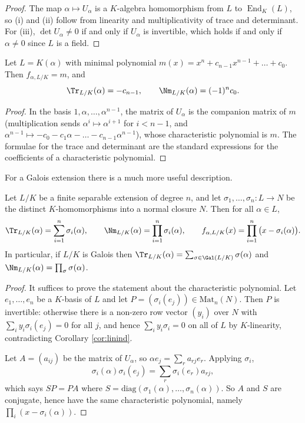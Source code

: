 \begin{proof}
	The map $\alpha \mapsto U_\alpha$ is a $K$-algebra homomorphism from $L$ to $\operatorname{End}_K(L)$, so (i) and (ii) follow from linearity and multiplicativity of trace and determinant. For (iii), $\det U_\alpha \neq 0$ if and only if $U_\alpha$ is invertible, which holds if and only if $\alpha \neq 0$ since $L$ is a field.
\end{proof}

\begin{proposition}\label{prop:charpolymin}
	Let $L = K(\alpha)$ with minimal polynomial $m(x) = x^n + c_{n-1}x^{n-1}+\dots+c_0$. Then $f_{\alpha,L/K} = m$, and
	$$\Tr_{L/K}(\alpha) = -c_{n-1}, \qquad \Nm_{L/K}(\alpha) = (-1)^nc_0.$$
\end{proposition}

\begin{proof}
	In the basis $1,\alpha,\dots,\alpha^{n-1}$, the matrix of $U_\alpha$ is the companion matrix of $m$ (multiplication sends $\alpha^i\mapsto\alpha^{i+1}$ for $i<n-1$, and $\alpha^{n-1}\mapsto -c_0-c_1\alpha-\dots-c_{n-1}\alpha^{n-1}$), whose characteristic polynomial is $m$. The formulae for the trace and determinant are the standard expressions for the coefficients of a characteristic polynomial.
\end{proof}

For a Galois extension there is a much more useful description.

\begin{proposition}\label{prop:tracegalois}
	Let $L/K$ be a finite separable extension of degree $n$, and let $\sigma_1,\dots,\sigma_n : L \to N$ be the distinct $K$-homomorphisms into a normal closure $N$. Then for all $\alpha \in L$,
	$$\Tr_{L/K}(\alpha) = \sum_{i=1}^n\sigma_i(\alpha), \qquad \Nm_{L/K}(\alpha) = \prod_{i=1}^n\sigma_i(\alpha), \qquad f_{\alpha,L/K}(x) = \prod_{i=1}^n\big(x - \sigma_i(\alpha)\big).$$
	In particular, if $L/K$ is Galois then $\Tr_{L/K}(\alpha) = \sum_{\sigma\in\Gal(L/K)}\sigma(\alpha)$ and $\Nm_{L/K}(\alpha)=\prod_{\sigma}\sigma(\alpha)$.
\end{proposition}

\begin{proof}
	It suffices to prove the statement about the characteristic polynomial. Let $e_1,\dots,e_n$ be a $K$-basis of $L$ and let $P = (\sigma_i(e_j)) \in \mathrm{Mat}_n(N)$. Then $P$ is invertible: otherwise there is a non-zero row vector $(y_i)$ over $N$ with $\sum_i y_i\sigma_i(e_j) = 0$ for all $j$, and hence $\sum_i y_i \sigma_i = 0$ on all of $L$ by $K$-linearity, contradicting Corollary \ref{cor:linind}.

	Let $A = (a_{ij})$ be the matrix of $U_\alpha$, so $\alpha e_j = \sum_r a_{rj}e_r$. Applying $\sigma_i$,
	$$\sigma_i(\alpha)\sigma_i(e_j) = \sum_r \sigma_i(e_r)a_{rj},$$
	which says $SP = PA$ where $S = \mathrm{diag}(\sigma_1(\alpha),\dots,\sigma_n(\alpha))$. So $A$ and $S$ are conjugate, hence have the same characteristic polynomial, namely $\prod_i(x-\sigma_i(\alpha))$.
\end{proof}

